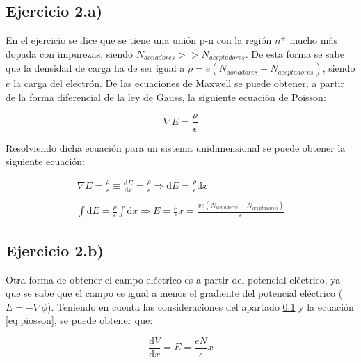 \documentclass[twoside]{article}
\begin{document}
		\subsection{Ejercicio 2.a)}
			\label{sec:2a}

			En el ejercicio se dice que se  tiene una unión p-n con la región $n^+$ mucho más dopada con impurezas, siendo $N_{donadores} >> N_{aceptadores}$. De esta forma se sabe que la densidad de carga ha de ser igual a $\rho = e(N_{donadores} - N_{aceptadores})$, siendo $e$ la carga del electrón. De las ecuaciones de Maxwell se puede obtener, a partir de la forma diferencial de la ley de Gauss, la siguiente ecuación de Poisson:

				\begin{equation}
					\nabla E = \frac{\rho}{\epsilon}
					\label{eq:piosson}
				\end{equation}

			Resolviendo dicha ecuación para un sistema unidimensional se puede obtener la siguiente ecuación:

				\begin{equation}
				\begin{matrix}
					\nabla E = \frac{\rho}{\epsilon} \equiv \frac{\mathrm{d} E}{\mathrm{d} x} = \frac{\rho} {\epsilon}\Rightarrow\mathrm{d} E = \frac{\rho} {\epsilon} \mathrm{d} x
					\\
					\\
					\int \mathrm{d}E = \frac{\rho}{\epsilon}\int \mathrm{d}x \Rightarrow E = \frac{\rho} {\epsilon} x = \frac{xe(N_{donadores} - N_{aceptadores})}{\epsilon}
					\end{matrix}
				\end{equation}

		\subsection{Ejercicio 2.b)}
			\label{sec:2b}

			Otra forma de obtener el campo eléctrico es a partir del potencial eléctrico, ya que se sabe que el campo es igual a menos el gradiente del potencial eléctrico ($E = -\nabla \phi$). Teniendo en cuenta las consideraciones del apartado \ref{sec:2a} y la ecuación \ref{eq:piosson}, se puede obtener que:

				\begin{equation}
					\frac{\mathrm{d}V} {\mathrm{d}x} = E = \frac{e N} {\epsilon} x
					\label{eq:poisson2}
				\end{equation}
\end{document}
